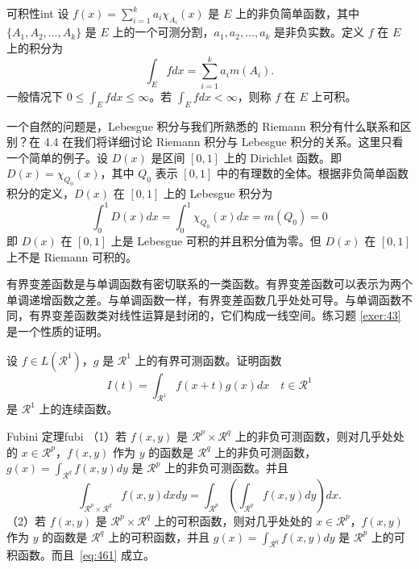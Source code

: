 \documentclass{elegantbook}
\begin{document}
\begin{definition}{可积性}{int}
设 $ f(x)=\sum\limits_{i=1}^{k} a_i \chi_{A_i}(x)$ 是 $E$ 上的非负简单函数，其中 $\{A_1,A_2,\ldots,A_k\}$ 是 $E$ 上的一个可测分割，$a_1,a_2,\ldots,a_k$ 是非负实数。定义 $f$ 在 $E$ 上的积分为
\begin{equation}
   \label{inter}
   \int_{E} f dx = \sum_{i=1}^k a_i m(A_i). 
\end{equation}
一般情况下 $0 \leq \int_{E} f dx \leq \infty$。若 $\int_{E} f dx < \infty$，则称 $f$ 在 $E$ 上可积。
\end{definition}

一个自然的问题是，Lebesgue 积分与我们所熟悉的 Riemann 积分有什么联系和区别？在 4.4 在我们将详细讨论 Riemann 积分与 Lebesgue 积分的关系。这里只看一个简单的例子。设 $D(x)$ 是区间 $[0,1]$ 上的 Dirichlet 函数。即 $D(x)=\chi_{Q_0}(x)$，其中 $Q_0$ 表示 $[0,1]$ 中的有理数的全体。根据非负简单函数积分的定义，$D(x)$ 在 $[0,1]$ 上的 Lebesgue 积分为
\begin{equation}
   \label{inter2}
   \int_0^1 D(x)dx = \int_0^1 \chi_{Q_0} (x) dx = m(Q_0) = 0
\end{equation}
即 $D(x)$ 在 $[0,1]$ 上是 Lebesgue 可积的并且积分值为零。但 $D(x)$ 在 $[0,1]$ 上不是 Riemann 可积的。


有界变差函数是与单调函数有密切联系的一类函数。有界变差函数可以表示为两个单调递增函数之差。与单调函数一样，有界变差函数几乎处处可导。与单调函数不同，有界变差函数类对线性运算是封闭的，它们构成一线空间。练习题 \ref{exer:43} 是一个性质的证明。

\begin{exercise}\label{exer:43}
设 $f\in L(\mathcal{R}^1)$，$g$ 是 $\mathcal{R}^1$ 上的有界可测函数。证明函数
\begin{equation}
   \label{ex:1}
   I(t) = \int_{\mathcal{R}^1} f(x+t)g(x)dx \quad t \in \mathcal{R}^1
\end{equation}
是 $\mathcal{R}^1$ 上的连续函数。
\end{exercise}

\begin{theorem}{Fubini 定理}{fubi} 
（1）若 $f(x,y)$ 是 $\mathcal{R}^p\times\mathcal{R}^q$ 上的非负可测函数，则对几乎处处的 $x\in \mathcal{R}^p$，$f(x,y)$ 作为 $y$ 的函数是 $\mathcal{R}^q$ 上的非负可测函数，$g(x)=\int_{\mathcal{R}^q}f(x,y) dy$ 是 $\mathcal{R}^p$ 上的非负可测函数。并且
\begin{equation}
   \label{eq:461}
   \int_{\mathcal{R}^p\times\mathcal{R}^q} f(x,y) dxdy=\int_{\mathcal{R}^p}\left(\int_{\mathcal{R}^q}f(x,y)dy\right)dx.
\end{equation}
（2）若 $f(x,y)$ 是 $\mathcal{R}^p\times\mathcal{R}^q$ 上的可积函数，则对几乎处处的 $x\in\mathcal{R}^p$，$f(x,y)$ 作为 $y$ 的函数是 $\mathcal{R}^q$ 上的可积函数，并且 $g(x)=\int_{\mathcal{R}^q}f(x,y) dy$ 是 $\mathcal{R}^p$ 上的可积函数。而且~\ref{eq:461} 成立。
\end{theorem}
\end{document}
